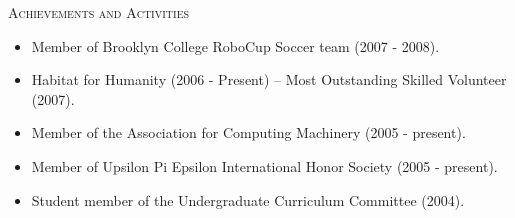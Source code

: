 \documentclass[11pt,oneside]{article}
\newenvironment{ressection}[1]{
	\vspace{4pt}
	{\fontfamily{phv}\selectfont\large\scshape#1}
	\begin{itemize}
	\vspace{3pt}
}{
	\end{itemize}
}
\newcommand{\resitem}[1]{
	\vspace{-5pt}
	\item \begin{flushleft} #1 \end{flushleft}
}
\begin{document}
\begin{ressection}{Achievements and Activities}
	
	\resitem{Member of Brooklyn College RoboCup Soccer team (2007 - 2008).}
	
	\resitem{Habitat for Humanity (2006 - Present) -- Most Outstanding Skilled Volunteer (2007).}

	\resitem{Member of the Association for Computing Machinery (2005 - present).}
	
	\resitem{Member of Upsilon Pi Epsilon International Honor Society (2005 - present).}

	\resitem{Student member of the Undergraduate Curriculum Committee (2004).}


\end{ressection}

\end{document}
